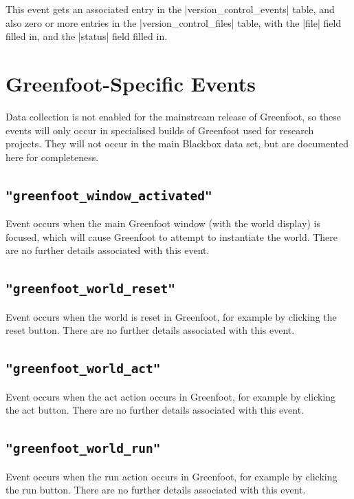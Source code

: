\documentclass{report}
\begin{document}
This event gets an associated entry in the |version_control_events|
table, and also zero or more entries in the |version_control_files|
table, with the |file| field filled in, and the |status| field filled
in.

\section{Greenfoot-Specific Events}

Data collection is not enabled for the mainstream release of Greenfoot,
so these events will only occur in specialised builds of Greenfoot
used for research projects.  They will not occur in the main Blackbox
data set, but are documented here for completeness.

\subsection{\lstinline!"greenfoot_window_activated"!}

Event occurs when the main Greenfoot window (with the world display) is
focused, which will cause Greenfoot to attempt to instantiate the world.
There are no further details associated with this event.

\subsection{\lstinline!"greenfoot_world_reset"!}

Event occurs when the world is reset in Greenfoot, for example
by clicking the reset button.
There are no further details associated with this event.

\subsection{\lstinline!"greenfoot_world_act"!}

Event occurs when the act action occurs in Greenfoot, for example
by clicking the act button.
There are no further details associated with this event.

\subsection{\lstinline!"greenfoot_world_run"!}

Event occurs when the run action occurs in Greenfoot, for example
by clicking the run button.
There are no further details associated with this event.
\end{document}
